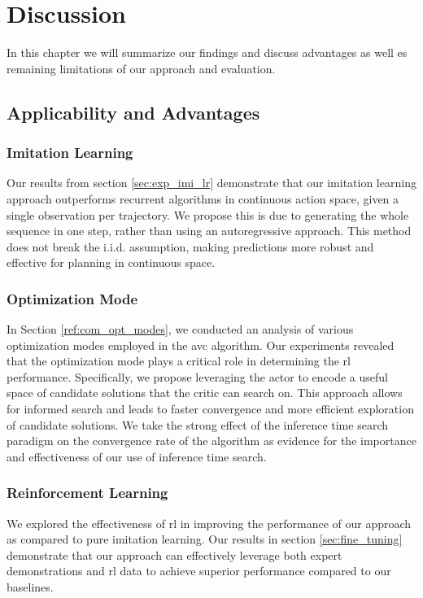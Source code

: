 
\chapter{Discussion}
\label{chapter:Discussion}
In this chapter we will summarize our findings and discuss advantages as well es remaining limitations of our approach and evaluation.
\section{Applicability and Advantages}
\subsection{Imitation Learning}
Our results from section \ref{sec:exp_imi_lr} demonstrate that our imitation learning approach outperforms recurrent algorithms in continuous action space, 
given a single observation per trajectory. We propose this is due to generating the whole sequence in one step, 
rather than using an autoregressive approach. This method does not break the i.i.d. assumption, making predictions more robust and effective 
for planning in continuous space. \\

\subsection{Optimization Mode}
In Section \ref{ref:com_opt_modes}, we conducted an analysis of various optimization modes employed in the \ac{avc} algorithm. 
Our experiments revealed that the optimization mode plays a critical role in determining the \ac{rl} performance. 
Specifically, we propose leveraging the actor to encode a useful space of candidate solutions that the critic can search on. 
This approach allows for informed search and leads to faster convergence and more efficient exploration of candidate solutions. We take the strong effect of the inference time 
search paradigm on the convergence rate of the algorithm as evidence for the importance and effectiveness of our use of inference time search.

\subsection{Reinforcement Learning}
We explored the effectiveness of \ac{rl} in improving the performance of our approach as compared to pure imitation learning. 
Our results in section \ref{sec:fine_tuning} demonstrate that our approach can effectively leverage both expert demonstrations and \ac{rl} data to achieve 
superior performance compared to our baselines.\\

